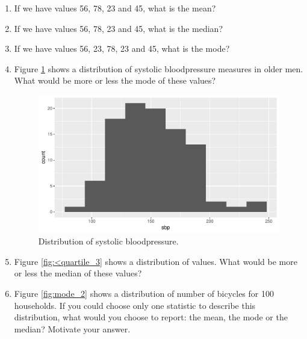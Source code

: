 \documentclass[]{report}\usepackage[]{graphicx}\usepackage[]{color}
\makeatletter
\def\maxwidth{ %
  \ifdim\Gin@nat@width>\linewidth
    \linewidth
  \else
    \Gin@nat@width
  \fi
}
\makeatother
\begin{document}
\begin{enumerate}

\item If we have values 56, 78, 23 and 45, what is the mean?

\item If we have values 56, 78, 23 and 45, what is the median?

\item If we have values 56, 23, 78, 23 and 45, what is the mode?

\item Figure \ref{fig:mode} shows a distribution of systolic bloodpressure measures in older men. What would be more or less the mode of these values?

\begin{figure}

{\centering \includegraphics[width=\maxwidth]{figure/mode-1} 

}

\caption[Distribution of systolic bloodpressure]{Distribution of systolic bloodpressure.}\label{fig:mode}
\end{figure}



\item Figure \ref{fig:<quartile_3} shows a distribution of values. What would be more or less the median of these values?

\item Figure \ref{fig:mode_2} shows a distribution of number of bicycles for 100 households. If you could choose only one statistic to describe this distribution, what would you choose to report: the mean, the mode or the median? Motivate your answer.

\begin{figure}


\end{figure}
\end{enumerate}
\end{document}
